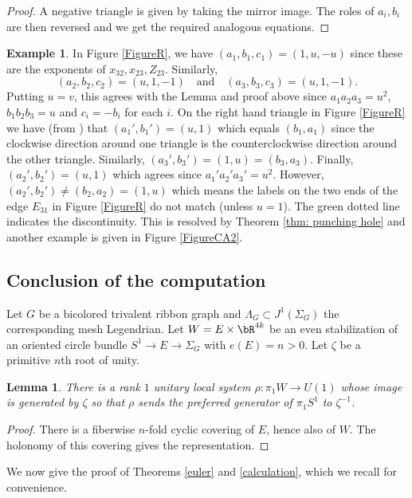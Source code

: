 \documentclass[JEP,XML,SOM,Unicode,NoFloatCountersInSection]{cedram}
\theoremstyle{plain}
\newtheorem{lemma}[theorem]{Lemma}
\theoremstyle{definition}
\newtheorem{example}[theorem]{Example}
\begin{document}
\begin{proof}
A negative triangle is given by taking the mirror image. The roles of $a_i,b_i$ are then reversed and we get the required analogous equations.
\end{proof}
\begin{example}
In Figure \ref{FigureR}, we have $(a_1,b_1,c_1)=(1,u,-u)$ since these are the expo\-nents of $x_{32},x_{23}, Z_{23}$. Similarly,
\[
(a_2,b_2,c_2)=(u,1,-1)\quad\text{and}\quad(a_3,b_3,c_3)=(u,1,-1).
\]
Putting $u=v$, this agrees with the Lemma and proof above since $a_1a_2a_3=u^2$, $b_1b_2b_3=u$ and $c_i=-b_i$ for each $i$. On the right hand triangle in Figure \ref{FigureR} we have (from \cite{IK93}) that $(a_1',b_1')=(u,1)$ which equals $(b_1,a_1)$ since the clockwise direction around one triangle is the counterclockwise direction around the other triangle. Similarly, $(a_3',b_3')=(1,u)=(b_3,a_3)$. Finally, $(a_2',b_2')=(u,1)$ which agrees since $a_1'a_2'a_3'=u^2$. However, $(a_2',b_2')\neq (b_2,a_2)=(1,u)$ which means the labels on the two ends of the edge $E_{31}$ in Figure \ref{FigureR} do not match (unless $u=1$). The green dotted line indicates the discontinuity. This is resolved by Theorem \ref{thm: punching hole} and another example is given in Figure \ref{FigureCA2}.
\end{example}

\subsection{Conclusion of the computation} Let $G$ be a bicolored trivalent ribbon graph and $\Lambda_G\subset J^1(\Sigma_G)$ the corresponding mesh Legendrian. Let $W=E \times \bR^{4k}$ be an even stabilization of an oriented circle bundle $S^1 \to E \to \Sigma_G$ with $e(E)=n>0$. Let $\zeta$ be a primitive $n$th root of unity.

\begin{lemma}
There is a rank $1$ unitary local system $\rho:\pi_1W\to U(1)$ whose image is generated by $\zeta$ so that $\rho$ sends the preferred generator of $\pi_1S^1$ to $\zeta^{-1}$.
\end{lemma}

\begin{proof}
There is a fiberwise $n$-fold cyclic covering of $E$, hence also of $W$. The holonomy of this covering gives the representation.
\end{proof}

We now give the proof of Theorems \ref{euler} and \ref{calculation}, which we recall for convenience.
\end{document}
